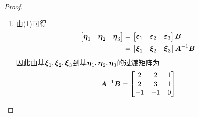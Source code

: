 \begin{proof}
\begin{enumerate}
{              }
        \item {
              由(1)可得
              \begin{align*}
                  \begin{bmatrix}\boldsymbol{\eta}_1&\boldsymbol{\eta}_2&\boldsymbol{\eta}_3\end{bmatrix}
                   & =
                  \begin{bmatrix}\boldsymbol{\varepsilon}_1&\boldsymbol{\varepsilon}_2&\boldsymbol{\varepsilon}_3\end{bmatrix}\boldsymbol{B}          \\
                   & =\begin{bmatrix}\boldsymbol{\xi}_1&\boldsymbol{\xi}_2&\boldsymbol{\xi}_3\end{bmatrix}{\boldsymbol{A}}^{-1}\boldsymbol{B}
              \end{align*}
              因此由基\(\boldsymbol{\xi}_1,\boldsymbol{\xi}_2,\boldsymbol{\xi}_3\)到基\(\boldsymbol{\eta}_1,\boldsymbol{\eta}_2,\boldsymbol{\eta}_3\)的过渡矩阵为
              \begin{equation*}
                  {\boldsymbol{A}}^{-1}\boldsymbol{B}=
                  \begin{bmatrix}
                      2  & 2  & 1 \\
                      2  & 3  & 1 \\
                      -1 & -1 & 0
                  \end{bmatrix}
              \end{equation*}
              }
    \end{enumerate}
\end{proof}

